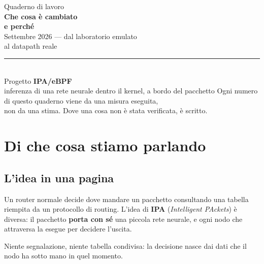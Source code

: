 \documentclass[11pt,a4paper,oneside]{report}
\begin{document}
\begin{titlepage}
\centering
\vspace*{3cm}
{\color{soft}\large Quaderno di lavoro}\\[1.2cm]
{\color{accent}\Huge\bfseries Che cosa è cambiato\\[0.3cm] e perché}\\[0.9cm]
{\Large Settembre 2026 --- dal laboratorio emulato\\ al datapath reale}\\[2.5cm]
\rule{0.6\linewidth}{0.8pt}\\[0.8cm]
{\large Progetto \textbf{IPA/eBPF}}\\[0.3cm]
{\color{soft} inferenza di una rete neurale dentro il kernel, a bordo del pacchetto}
\vfill
{\color{soft}\small Ogni numero di questo quaderno viene da una misura eseguita,\\
non da una stima. Dove una cosa non è stata verificata, è scritto.}
\end{titlepage}

\tableofcontents
\clearpage

\chapter{Di che cosa stiamo parlando}

\section{L'idea in una pagina}

Un router normale decide dove mandare un pacchetto consultando una tabella
riempita da un protocollo di routing. L'idea di \textbf{IPA} (\emph{Intelligent
PAckets}) è diversa: il pacchetto \textbf{porta con sé} una piccola rete
neurale, e ogni nodo che attraversa la esegue per decidere l'uscita.

Niente segnalazione, niente tabella condivisa: la decisione nasce dai dati che
il nodo ha sotto mano in quel momento.

\begin{center}
\end{center}
\end{document}
